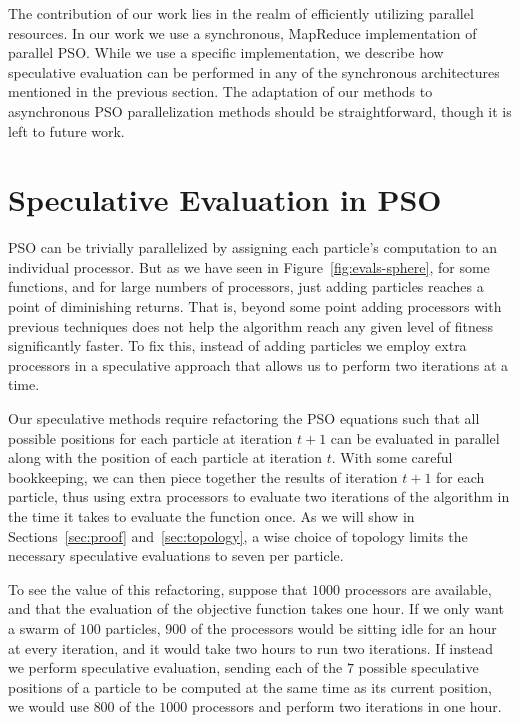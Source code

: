 \documentclass[smallcondensed]{svjour3}
\newcommand{\fig}[1]{Figure~\ref{fig:#1}}
\begin{document}
The contribution of our work lies in the realm of efficiently utilizing
parallel resources.  In our work we use a synchronous, MapReduce implementation
of parallel PSO.  While we use a specific implementation, we describe how
speculative evaluation can be performed in any of the synchronous architectures
mentioned in the previous section.  The adaptation of our methods to
asynchronous PSO parallelization methods should be straightforward, though it
is left to future work.

\section{Speculative Evaluation in PSO}
\label{sec:sepso}

PSO can be trivially parallelized by assigning each particle's computation to
an individual processor.  But as we have seen in \fig{evals-sphere}, for some
functions, and for large numbers of processors, just adding particles reaches a
point of diminishing returns.  That is, beyond some point adding processors
with previous techniques does not help the algorithm reach any given level of
fitness significantly faster.  To fix this, instead of adding particles we
employ extra processors in a speculative approach that allows us to perform two
iterations at a time.

Our speculative methods require refactoring the PSO equations such that all
possible positions for each particle at iteration $t+1$ can be evaluated in
parallel along with the position of each particle at iteration $t$.  With some
careful bookkeeping, we can then piece together the results of iteration $t+1$
for each particle, thus using extra processors to evaluate two iterations of
the algorithm in the time it takes to evaluate the function once.  As we will
show in Sections~\ref{sec:proof} and~\ref{sec:topology}, a wise choice of
topology limits the necessary speculative evaluations to seven per particle.

To see the value of this refactoring, suppose that $1000$ processors are
available, and that the evaluation of the objective function takes one hour.
If we only want a swarm of $100$ particles, $900$ of the processors would be
sitting idle for an hour at every iteration, and it would take two hours to run
two iterations.  If instead we perform speculative evaluation, sending each of
the $7$ possible speculative positions of a particle to be computed at the same
time as its current position, we would use $800$ of the $1000$ processors and
perform two iterations in one hour.
\end{document}
